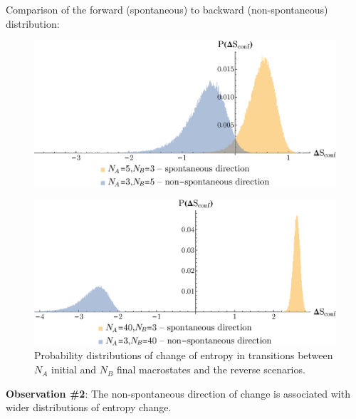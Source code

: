 \documentclass[a0]{sciposter}
\begin{document}
\begin{multicols}{3}
\begin{flushleft}
Comparison of the forward (spontaneous) to backward (non-spontaneous) distribution:

\begin{minipage}[b]{22.0cm}
\centering
\begin{figure}[ht!]
\includegraphics[width=22cm]{Figure3.eps} 
\end{figure}
\end{minipage}
\begin{minipage}[b]{23.0cm}
\centering
\begin{figure}[ht!]
\includegraphics[width=23cm]{Figure4.eps} \caption{Probability distributions of change of entropy in transitions between $N_A$ initial and $N_B$ final macrostates and the reverse scenarios.}
\label{Fig4} 
\end{figure}
\end{minipage}

\vspace{0.3cm} 

\begin{tcolorbox}[colframe=green!500!white,colback=white!50!white,boxrule=3pt]
\textbf{Observation \#2}: The non-spontaneous direction of change is associated with wider distributions of entropy change.
\end{tcolorbox}


\end{flushleft}
\end{multicols}
\end{document}
